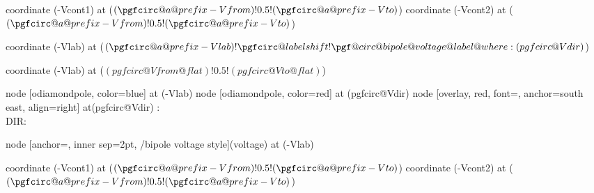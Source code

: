 {    \ifpgf@circuit@bipole@isvoltage
        \pgf@circ@drawvoltagegenerator
        coordinate (\pgfcirc@a@prefix-Vcont1) at ($(\pgfcirc@a@prefix-Vfrom) !0.5! (\pgfcirc@a@prefix-Vto)$)
        coordinate (\pgfcirc@a@prefix-Vcont2) at ($(\pgfcirc@a@prefix-Vfrom) !0.5! (\pgfcirc@a@prefix-Vto)$)
    \else
        \pgf@circ@drawvoltagegeneric
    \fi

    coordinate (\pgfcirc@a@prefix-Vlab) at ($(\pgfcirc@a@prefix-Vlab) ! \pgfcirc@labelshift ! \pgf@circ@bipole@voltage@label@where :(pgfcirc@Vdir)$)

    \ifpgf@circuit@europeanvoltage
    \else
        \ifx\@@kind\@@open
        coordinate (\pgfcirc@a@prefix-Vlab) at ($(pgfcirc@Vfrom@flat)!0.5!(pgfcirc@Vto@flat)$)\fi
    \fi

    \ifpgf@circ@debugv
            node [odiamondpole, color=blue] at (\pgfcirc@a@prefix-Vlab) {}
            node [odiamondpole, color=red] at (pgfcirc@Vdir) {}
            node [overlay, red, font=\tiny, anchor=south east, align=right] at(pgfcirc@Vdir)
            {\whichtypeshift:\the\pgfcirc@labelshift\\ DIR:\pgf@circ@bipole@voltage@label@where}
    \fi

    \else
        node [anchor=\pgf@circ@bipole@voltage@label@anchor, inner sep=2pt,
        \circuitikzbasekey/bipole voltage style](voltage)
        at (\pgfcirc@a@prefix-Vlab) {}
    \fi

    \ifpgfcirc@v@curved\else
        coordinate (\pgfcirc@a@prefix-Vcont1) at ($(\pgfcirc@a@prefix-Vfrom) !0.5! (\pgfcirc@a@prefix-Vto)$)
        coordinate (\pgfcirc@a@prefix-Vcont2) at ($(\pgfcirc@a@prefix-Vfrom) !0.5! (\pgfcirc@a@prefix-Vto)$)
    \fi
    \ifpgf@circuit@bipole@voltage@backward
    \fi

}%

